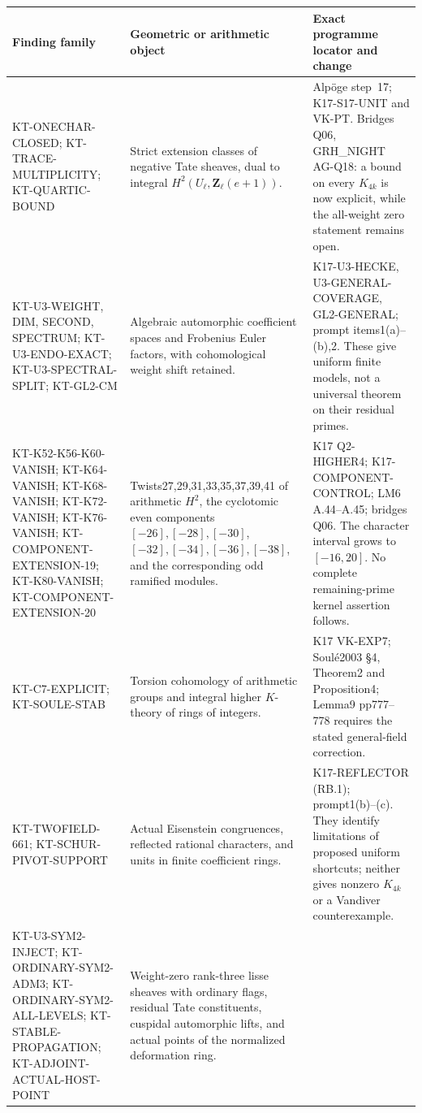 \small
\begin{longtable}{>{\raggedright\arraybackslash}p{}
>{\raggedright\arraybackslash}p{}
>{\raggedright\arraybackslash}p{}}
\toprule
Finding family & Geometric or arithmetic object & Exact programme locator and change\\
\midrule\endhead
KT-ONECHAR-CLOSED; KT-TRACE-MULTIPLICITY; KT-QUARTIC-BOUND &
Strict extension classes of negative Tate sheaves, dual to
integral $H^2(U_\ell,\mathbf Z_\ell(e+1))$. &
Alp\"oge step~17; K17-S17-UNIT and VK-PT. Bridges Q06,
GRH\_NIGHT AG-Q18: a bound on every $K_{4k}$ is now explicit,
while the all-weight zero statement remains open.\\
KT-U3-WEIGHT, DIM, SECOND, SPECTRUM; KT-U3-ENDO-EXACT; KT-U3-SPECTRAL-SPLIT; KT-GL2-CM &
Algebraic automorphic coefficient spaces and Frobenius Euler
factors, with cohomological weight shift retained. &
K17-U3-HECKE, U3-GENERAL-COVERAGE, GL2-GENERAL; prompt
items1(a)--(b),2. These give uniform finite models, not a
universal theorem on their residual primes.\\
KT-K52-K56-K60-VANISH; KT-K64-VANISH; KT-K68-VANISH; KT-K72-VANISH;
KT-K76-VANISH; KT-COMPONENT-EXTENSION-19;
KT-K80-VANISH; KT-COMPONENT-EXTENSION-20 &
Twists27,29,31,33,35,37,39,41 of arithmetic $H^2$, the cyclotomic even components
$[-26],[-28],[-30]$, $[-32],[-34],[-36],[-38]$, and the corresponding odd ramified modules. &
K17 Q2-HIGHER4; K17-COMPONENT-CONTROL; LM6 A.44--A.45;
bridges Q06. The character interval grows to $[-16,20]$.
No complete remaining-prime kernel assertion follows.\\
KT-C7-EXPLICIT; KT-SOULE-STAB &
Torsion cohomology of arithmetic groups and integral higher
$K$-theory of rings of integers. &
K17 VK-EXP7; Soul\'e2003 \S4, Theorem2 and Proposition4;
Lemma9 pp777--778 requires the stated general-field correction.\\
KT-TWOFIELD-661; KT-SCHUR-PIVOT-SUPPORT &
Actual Eisenstein congruences, reflected rational characters,
and units in finite coefficient rings. &
K17-REFLECTOR (RB.1); prompt1(b)--(c). They identify
limitations of proposed uniform shortcuts; neither gives
nonzero $K_{4k}$ or a Vandiver counterexample.\\
KT-U3-SYM2-INJECT; KT-ORDINARY-SYM2-ADM3;
KT-ORDINARY-SYM2-ALL-LEVELS;
KT-STABLE-PROPAGATION; KT-ADJOINT-ACTUAL-HOST-POINT &
Weight-zero rank-three lisse sheaves with ordinary flags,
residual Tate constituents, cuspidal automorphic lifts, and
actual points of the normalized deformation ring. &

\end{longtable}
